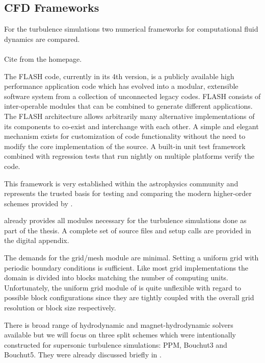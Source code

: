 \subsection{CFD Frameworks}

For the turbulence simulations two numerical frameworks for computational fluid
dynamics are compared.

\paragraph{\FLASH}
Cite from the homepage.

The FLASH code, currently in its 4th version, is a publicly available high
performance application code which has evolved into a modular, extensible
software system from a collection of unconnected legacy codes. FLASH consists
of inter-operable modules that can be combined to generate different
applications. The FLASH architecture allows arbitrarily many alternative
implementations of its components to co-exist and interchange with each other.
A simple and elegant mechanism exists for customization of code functionality
without the need to modify the core implementation of the source. A built-in
unit test framework combined with regression tests that run nightly on multiple
platforms verify the code. 

This framework is very established within the astrophysics community and
represents the trusted basis for testing and comparing the modern higher-order
schemes provided by \FLEXI.

\FLASH already provides all modules necessary for the turbulence simulations
done as part of the thesis. A complete set of source files and setup calls
are provided in the digital appendix.

The demands for the grid/mesh module are minimal. Setting a uniform grid with
periodic boundary conditions is sufficient. Like most grid implementations the
domain is divided into blocks matching the number of computing units.
Unfortunately, the uniform grid module of \FLASH is quite unflexible with
regard to possible block configurations since they are tightly coupled with the
overall grid resolution or block size respectively.

There is broad range of hydrodynamic and magnet-hydrodynamic solvers available
but we will focus on three split schemes which were intentionally constructed
for supersonic turbulence simulations: PPM, Bouchut3 and Bouchut5. They
were already discussed briefly in .

